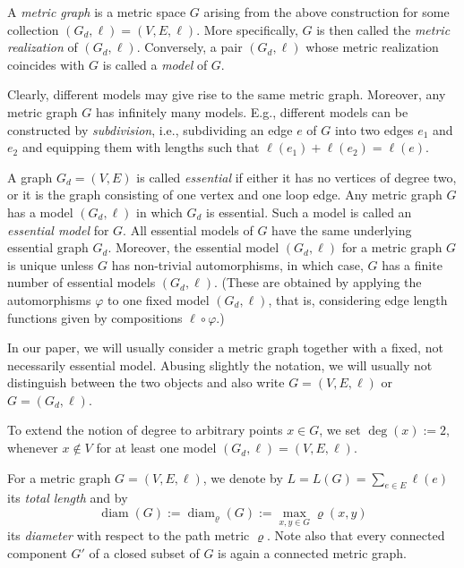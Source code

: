 \documentclass[reqno]{amsart}
\theoremstyle{plain}
\theoremstyle{definition}
\theoremstyle{remark}
\numberwithin{equation}{section}
\newcommand{\diam}{\operatorname{diam}}
\begin{document}
A \emph{metric graph} is a metric space $G$ arising from the above construction for some collection $(G_d, \ell) =(V, E,\ell)$. More specifically, $G$ is then called the \emph{metric realization} of $(G_d, \ell)$. Conversely, a pair $(G_d, \ell)$ whose metric realization coincides with $G$ is called a \emph{model} of $G$.



Clearly, different models may give rise to the same metric graph. Moreover, any metric graph $G$ has infinitely many models. E.g., different models can be constructed by {\em subdivision}, i.e., subdividing an edge $e$ of $G$ into two edges $e_1$ and $e_2$ and equipping them with lengths such that $\ell(e_1)  + \ell(e_2)= \ell(e)$. 

A graph $G_d = (V,E)$ is called \emph{essential} if either it has no vertices of degree two, or it is the graph consisting of one vertex and one loop edge. Any metric graph $G$ has a model $(G_d, \ell)$ in which $G_d$ is essential. Such a model is called an \emph{essential model} for $G$. All essential models of $G$ have the same underlying essential graph $G_d$. Moreover, the essential model $(G_d, \ell)$ for a metric graph $G$ is unique unless $G$ has non-trivial automorphisms, in which case, $G$ has a finite number of essential models $(G_d, \ell)$. (These are obtained by applying the automorphisms $\varphi$ to one fixed model $(G_d, \ell)$, that is, considering edge length functions given by compositions $\ell \circ \varphi$.)


In our paper, we will usually consider a metric graph together with a fixed, not necessarily essential model. Abusing slightly the notation, we will usually not distinguish between the two objects and also write $G = (V, E, \ell)$ or $G= (G_d, \ell)$.


To extend the notion of degree to arbitrary points $x \in G$, we set $\deg(x) := 2$, whenever $x \notin V$ for at least one model $(G_d, \ell) = (V,E,\ell) $.  

For a metric graph $G = (V,E, \ell)$, we denote by $L= L(G)=\sum_{e\in E} \ell(e)$ its {\em total length} and by
\[
\diam(G) := \diam_\varrho(G) := \max_{x,y \in G} \varrho(x,y)
\]
its {\em diameter} with respect to the path metric $\varrho$. Note also that every connected component $G'$ of a closed subset of $G$ is again a connected metric graph.
\end{document}
